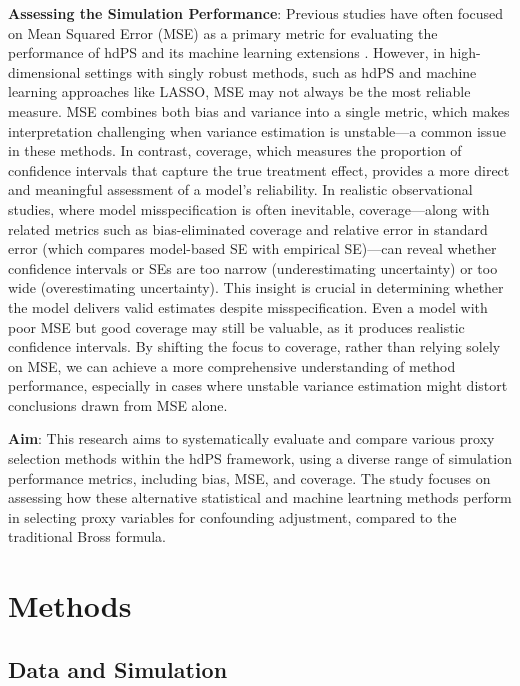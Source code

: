 \documentclass[sn-vancouver,Numbered,lineno,pdflatex]{sn-jnl}
\begin{document}
\textbf{Assessing the Simulation Performance}: Previous studies have
often focused on Mean Squared Error (MSE) as a primary metric for
evaluating the performance of hdPS and its machine learning extensions
\citep{karim2018can, franklin2015regularized}. However, in
high-dimensional settings with singly robust methods, such as hdPS and
machine learning approaches like LASSO, MSE may not always be the most
reliable measure. MSE combines both bias and variance into a single
metric, which makes interpretation challenging when variance estimation
is unstable---a common issue in these methods. In contrast, coverage,
which measures the proportion of confidence intervals that capture the
true treatment effect, provides a more direct and meaningful assessment
of a model's reliability. In realistic observational studies, where
model misspecification is often inevitable, coverage---along with
related metrics such as bias-eliminated coverage and relative error in
standard error (which compares model-based SE with empirical SE)---can
reveal whether confidence intervals or SEs are too narrow
(underestimating uncertainty) or too wide (overestimating uncertainty).
This insight is crucial in determining whether the model delivers valid
estimates despite misspecification. Even a model with poor MSE but good
coverage may still be valuable, as it produces realistic confidence
intervals. By shifting the focus to coverage, rather than relying solely
on MSE, we can achieve a more comprehensive understanding of method
performance, especially in cases where unstable variance estimation
might distort conclusions drawn from MSE alone.

\textbf{Aim}: This research aims to systematically evaluate and compare
various proxy selection methods within the hdPS framework, using a
diverse range of simulation performance metrics, including bias, MSE,
and coverage. The study focuses on assessing how these alternative
statistical and machine leartning methods perform in selecting proxy
variables for confounding adjustment, compared to the traditional Bross
formula.

\section{Methods}\label{methods}

\subsection*{Data and Simulation}\label{data-and-simulation}
\end{document}
